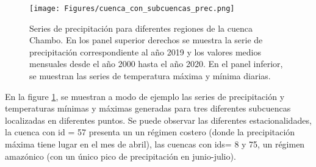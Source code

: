 \begin{figure}[h!]
  \begin{center}
    \texttt{[image: Figures/cuenca\_con\_subcuencas\_prec.png]}
    \caption{ Series de precipitación para diferentes regiones de la cuenca Chambo. En los panel superior derechos se muestra la serie 
    de precipitación correspondiente al año 2019 y  los valores medios mensuales desde el año 2000 hasta el año 2020. En el panel 
    inferior, se muestran las series de temperatura máxima y mínima diarias.}
    \label{4}
  \end{center}
\end{figure}

En la figure \ref{4}, se muestran a modo de ejemplo las series de precipitación y temperaturas
mínimas y máximas generadas para tres diferentes subcuencas 
localizadas en diferentes puntos. Se puede observar las diferentes estacionalidades,
la cuenca con id = 57 presenta un  un régimen costero (donde la precipitación máxima tiene lugar en el mes de abril), 
las cuencas con ids= 8 y 75, un régimen amazónico (con un único pico de precipitación en junio-julio).


